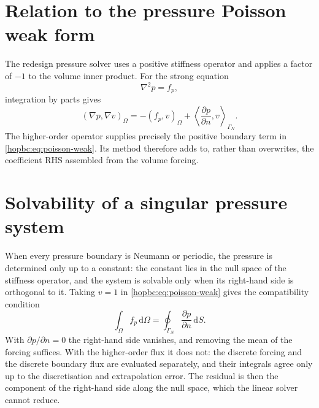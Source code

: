 \section{Relation to the pressure Poisson weak form}

The redesign pressure solver uses a positive stiffness operator and applies a
factor of \(-1\) to the volume inner product.  For the strong equation
\begin{equation}
  \nabla^2p=f_p,
\end{equation}
integration by parts gives
\begin{equation}
  (\nabla p,\nabla v)_\Omega
  =-(f_p,v)_\Omega
   +\left\langle\frac{\partial p}{\partial n},v\right\rangle_{\Gamma_N}.
  \label{hopbc:eq:poisson-weak}
\end{equation}
The higher-order operator supplies precisely the positive boundary term in
\eqref{hopbc:eq:poisson-weak}.  Its  method therefore adds to, rather
than overwrites, the coefficient RHS assembled from the volume forcing.

\section{Solvability of a singular pressure system}
\label{hopbc:sec:neumann-balance}

When every pressure boundary is Neumann or periodic, the pressure is
determined only up to a constant: the constant lies in the null space of the
stiffness operator, and the system is solvable only when its right-hand side
is orthogonal to it. Taking \(v=1\) in \eqref{hopbc:eq:poisson-weak} gives
the compatibility condition
\begin{equation}
  \boxed{
  \int_\Omega f_p\,\mathrm d\Omega
  =\oint_{\Gamma_N}\frac{\partial p}{\partial n}\,\mathrm dS.}
  \label{hopbc:eq:compatibility}
\end{equation}
With \(\partial p/\partial n=0\) the right-hand side vanishes, and removing
the mean of the forcing suffices. With the higher-order flux it does not: the
discrete forcing and the discrete boundary flux are evaluated separately, and
their integrals agree only up to the discretisation and extrapolation error.
The residual is then the component of the right-hand side along the null
space, which the linear solver cannot reduce.


